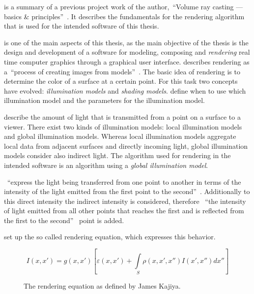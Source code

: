\documentclass[%
    a4paper,    %
    justified,  %
    nobib,      %
    openany     %
]{tufte-book}
\begin{document}
 is a summary of a previous project
work of the author,~\enquote{Volume ray casting --- basics \&
principles}~\cite{osterwalder_volume_2016}. It describes the fundamentals for
the rendering algorithm that is used for the intended software of this thesis.

 is one of the main aspects of this thesis, as the main
objective of the thesis is the design and development of a software for
modeling, composing and \textit{rendering} real time computer graphics through a
graphical user interface. \citeauthor{foley_computer_1996} describes rendering
as a~\enquote{process of creating images from
models}~\cite{foley_computer_1996}. The basic idea of rendering is to determine
the color of a surface at a certain point. For this task two concepts have
evolved: \textit{illumination models} and \textit{shading models}.
 define when to use which illumination model and the
parameters for the illumination model.

 describe the amount of light that is
transmitted from a point on a surface to a viewer. There exist two kinds of
illumination models: local illumination models and global illumination models.
Whereas local illumination models aggregate local data from adjacent surfaces
and directly incoming light, global illumination models consider also indirect
light. The algorithm used for rendering in the intended software is an
algorithm using a \textit{global illumination model}.

~\enquote{express the light being
transferred from one point to another in terms of the intensity of the light
emitted from the first point to the second}~\cite[pp. 775 and
776]{foley_computer_1996}. Additionally to this direct intensity the indirect
intensity is considered, therefore ~\enquote{the intensity of light emitted from
all other points that reaches the first and is reflected from the first to the
second}~\cite[pp. 775 and 776]{foley_computer_1996} point is added.

\newpage{}

 set up the so called rendering
equation, which expresses this behavior.~\parencites{kajiya_rendering_1986}[p.
776]{foley_computer_1996}

\begin{figure}
  \label{eq:rendering-equation}
  \caption{The rendering equation as defined by James Kajiya.}
  \begin{equation}
    I(x, x') = g(x, x')[\varepsilon(x, x') + \int\limits_{S}\rho(x, x', x'')I(x', x'')dx'']
  \end{equation}
\end{figure}
\end{document}
